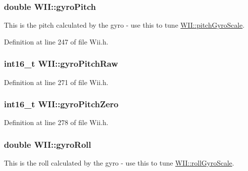 \hypertarget{class_w_i_i_af61f57d34b81f2a878f0126a074e3af4}{
\subsubsection[{gyro\-Pitch}]{\setlength{\rightskip}{0pt plus 5cm}double {\bf \-W\-I\-I\-::gyro\-Pitch}}}\label{class_w_i_i_af61f57d34b81f2a878f0126a074e3af4}
\-This is the pitch calculated by the gyro -\/ use this to tune \hyperlink{class_w_i_i_aea6ce6f3222df3e547e9957673c7a07a}{\-W\-I\-I\-::pitch\-Gyro\-Scale}. 

\-Definition at line 247 of file \-Wii.\-h.

\hypertarget{class_w_i_i_a749ea9dd39ba9a5320c5b24ce93bc544}{
\subsubsection[{gyro\-Pitch\-Raw}]{\setlength{\rightskip}{0pt plus 5cm}int16\-\_\-t {\bf \-W\-I\-I\-::gyro\-Pitch\-Raw}}}\label{class_w_i_i_a749ea9dd39ba9a5320c5b24ce93bc544}


\-Definition at line 271 of file \-Wii.\-h.

\hypertarget{class_w_i_i_abbc31ecd4495d70258cfa095e34cb3c3}{
\subsubsection[{gyro\-Pitch\-Zero}]{\setlength{\rightskip}{0pt plus 5cm}int16\-\_\-t {\bf \-W\-I\-I\-::gyro\-Pitch\-Zero}}}\label{class_w_i_i_abbc31ecd4495d70258cfa095e34cb3c3}


\-Definition at line 278 of file \-Wii.\-h.

\hypertarget{class_w_i_i_a2a0e4745bff7cfec644bcebe984c2bc8}{
\subsubsection[{gyro\-Roll}]{\setlength{\rightskip}{0pt plus 5cm}double {\bf \-W\-I\-I\-::gyro\-Roll}}}\label{class_w_i_i_a2a0e4745bff7cfec644bcebe984c2bc8}
\-This is the roll calculated by the gyro -\/ use this to tune \hyperlink{class_w_i_i_a6c0971ae4c9ab752888a5871020c8331}{\-W\-I\-I\-::roll\-Gyro\-Scale}. 

